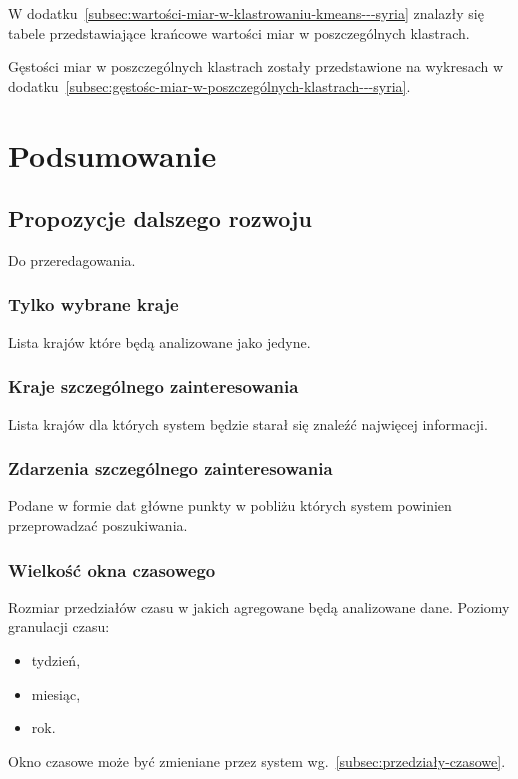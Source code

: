 \documentclass[11pt]{report}
\begin{document}
    W dodatku~\ref{subsec:wartości-miar-w-klastrowaniu-kmeans---syria} znalazły się tabele przedstawiające krańcowe wartości miar w poszczególnych klastrach.

    Gęstości miar w poszczególnych klastrach zostały przedstawione na wykresach w dodatku~\ref{subsec:gęstośc-miar-w-poszczególnych-klastrach---syria}.


    \chapter{Podsumowanie}\label{ch:podsumowanie}


    \section{Propozycje dalszego rozwoju}
    Do przeredagowania.

    \subsection{Tylko wybrane kraje}
    Lista krajów które będą analizowane jako jedyne.

    \subsection{Kraje szczególnego zainteresowania}
    Lista krajów dla których system będzie starał się znaleźć najwięcej informacji.

    \subsection{Zdarzenia szczególnego zainteresowania}
    Podane w formie dat główne punkty w pobliżu których system powinien przeprowadzać poszukiwania.

    \subsection{Wielkość okna czasowego}
    Rozmiar przedziałów czasu w jakich agregowane będą analizowane dane.
    Poziomy granulacji czasu:
    \begin{itemize}
        \item tydzień,
        \item miesiąc,
        \item rok.
    \end{itemize}
    Okno czasowe może być zmieniane przez system wg.~\ref{subsec:przedziały-czasowe}.
\end{document}
